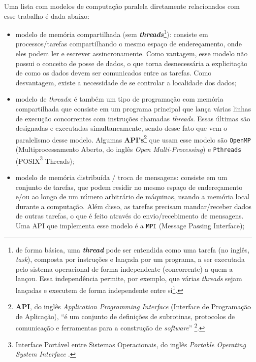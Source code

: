 		Uma lista com modelos de computação paralela diretamente relacionados 
		com esse trabalho é dada abaixo:    
        \begin{itemize}
            \item modelo de memória compartilhada (sem
            \textit{\textbf{threads}}\footnote{de forma básica, uma
            \textit{\textbf{thread}} pode ser entendida como uma tarefa 
            (no inglês, \textit{task}), composta por instruções e lançada por 
            um programa, a ser executada pelo sistema operacional de forma 
            independente (concorrente) a quem a lançou. Essa independência
            permite, por exemplo, que várias \textit{threads} sejam lançadas
            e executem de forma independente entre si\footcite{LLNL:pthreads}.}): 
	        consiste em processos/tarefas compartilhando o mesmo espaço de 
	        endereçamento, onde eles podem ler e escrever assincronamente. 
	        Como vantagem, esse modelo não possui o conceito de posse de 
	        dados, o que torna desnecessária a explicitação de como os dados 
	        devem ser comunicados entre as tarefas. Como desvantagem, existe
	        a necessidade de se controlar a  localidade dos dados;
            
            \item modelo de \textit{threads}: é também um tipo de programação 
            com memória compartilhada que consiste em um programa principal 
            que lança várias linhas de execução concorrentes com instruções 
            chamadas \textit{threads}. Essas últimas são designadas e 
            executadas simultaneamente, sendo desse fato que vem o 
            paralelismo desse modelo. Algumas 
            \textbf{API's}\footnote{\textbf{API}, do inglês 
            \textit{Application Programming Interface} (Interface de 
            Programação de Aplicação), ``é um conjunto de definições de 
            subrotinas, protocolos de comunicação e ferramentas para a 
            construção de \textit{software}'' \footcite{wiki:API}.}
            que usam esse modelo são \texttt{OpenMP} (Multiprocessamento Aberto, do inglês \textit{Open Multi-Processing}) 
            e \texttt{Pthreads} (POSIX\footnote{Interface Portável entre 
            Sistemas Operacionais, do inglês \textit{Portable Operating 
            System Interface} \cite{wiki:POSIX}.} Threads);
            
            \item modelo de memória distribuída / troca de mensagens: 
            consiste em um conjunto de tarefas, que podem residir no mesmo
            espaço de endereçamento e/ou ao longo de um número arbitrário de 
            máquinas, usando a memória local durante a computação. Além disso,
            as tarefas precisam mandar/receber dados de outras tarefas, o que
            é feito através do envio/recebimento de mensagens. Uma API que 
            implementa esse modelo é a \texttt{MPI} (Message Passing 
            Interface);
            

\end{itemize}
